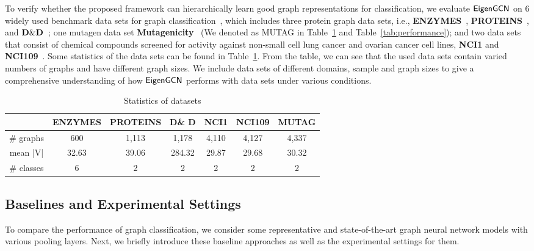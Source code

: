 \documentclass[sigconf]{acmart}
\newcommand{\m}{{\sf {EigenGCN}}}
\begin{document}
To verify whether the proposed framework can hierarchically learn good graph representations for classification, we evaluate $\m$ on 6 widely used benchmark data sets for graph classification~\cite{KKMMN2016}, which includes three protein graph data sets, i.e., {\bf ENZYMES}~\cite{borgwardt2005protein,schomburg2004brenda}, {\bf PROTEINS}~\cite{borgwardt2005protein,dobson2003distinguishing}, and ${\bf D\& D}$~\cite{dobson2003distinguishing,shervashidze2011weisfeiler}; one mutagen data set {\bf Mutagenicity}~\cite{riesen2008iam,kazius2005derivation} (We denoted as MUTAG in Table~\ref{tab:statistics} and Table~\ref{tab:performance}); and two data sets that consist of chemical compounds screened for activity against non-small cell lung cancer and ovarian cancer cell lines, {\bf NCI1} and {\bf NCI109}~\cite{wale2008comparison}. 
Some statistics of the data sets can be found in Table~\ref{tab:statistics}. From the table, we can see that the used data sets contain varied numbers of graphs and have different graph sizes. We include data sets of different domains, sample and graph sizes
to give a comprehensive understanding of how $\m$ performs with data sets under various conditions.
{\footnotesize
\begin{table}[h]
	\begin{center}
		\vspace{-0.15in}
		\caption{Statistics of datasets\label{tab:statistics}}
		\vspace*{-0.15in}
		\begin{tabular}{c |c|c |c|c|c|c} 
			\hline
			&ENZYMES & PROTEINS& D\& D & NCI1 & NCI109 & MUTAG \\ 
			\hline
			$\#$ graphs &600  & 1,113 & 1,178 & 4,110&4,127& 4,337\\
			\hline
			 mean |V| & 32.63& 39.06 & 284.32 & 29.87 &29.68&30.32\\
			\hline
			$\#$ classes & 6 & 2&2 &2 &2& 2\\
			\hline 
		\end{tabular}
			\vspace{-0.15in}
	\end{center}
\end{table}
}
\subsection{Baselines and Experimental Settings}

To compare the performance of graph classification, we consider some representative and state-of-the-art graph neural network models with various pooling layers. Next, we briefly introduce these baseline approaches as well as the experimental settings for them. 
 
\end{document}
